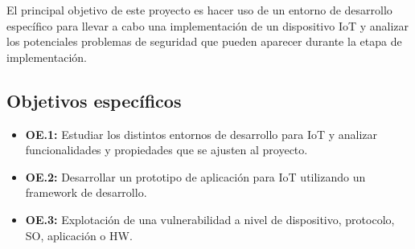 El principal objetivo de este proyecto es hacer uso de un entorno de desarrollo específico para llevar a cabo una implementación de un dispositivo IoT y analizar los potenciales problemas de seguridad que pueden aparecer durante la etapa de implementación.

\subsection{Objetivos específicos}

\begin{itemize}
    \item \textbf{OE.1:} Estudiar los distintos entornos de desarrollo para IoT y analizar funcionalidades y propiedades que se ajusten al proyecto.
    \item \textbf{OE.2:} Desarrollar un prototipo de aplicación para IoT utilizando un framework de desarrollo.
    \item \textbf{OE.3:} Explotación de una vulnerabilidad a nivel de dispositivo, protocolo, SO, aplicación o HW.
\end{itemize}






